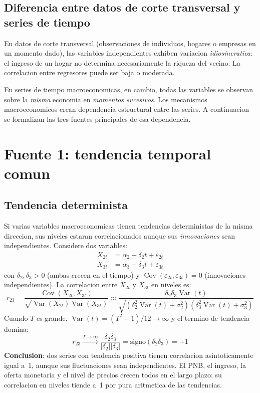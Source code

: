 \documentclass[12pt, letterpaper]{article}
\theoremstyle{remark}
\newcommand{\Var}{\operatorname{Var}}
\newcommand{\Cov}{\operatorname{Cov}}
\begin{document}
\subsection{Diferencia entre datos de corte transversal y series de tiempo}

En datos de corte transversal (observaciones de individuos, hogares o empresas
en un momento dado), las variables independientes exhiben variacion
\emph{idiosincratica}: el ingreso de un hogar no determina necesariamente la
riqueza del vecino. La correlacion entre regresores puede ser baja o moderada.

En series de tiempo macroeconomicas, en cambio, todas las variables se observan
sobre la \emph{misma} economia en \emph{momentos sucesivos}. Los mecanismos
macroeconomicos crean dependencia estructural entre las series. A continuacion
se formalizan las tres fuentes principales de esa dependencia.

\section{Fuente 1: tendencia temporal comun}

\subsection{Tendencia determinista}

Si varias variables macroeconomicas tienen tendencias deterministas de la misma
direccion, sus niveles estaran correlacionados aunque sus \emph{innovaciones}
sean independientes. Considere dos variables:
\begin{align}
  X_{2t} &= \alpha_2 + \delta_2 t + \varepsilon_{2t}
  \label{eq:trend2}\\
  X_{3t} &= \alpha_3 + \delta_3 t + \varepsilon_{3t}
  \label{eq:trend3}
\end{align}
con $\delta_2, \delta_3 > 0$ (ambas crecen en el tiempo) y
$\Cov(\varepsilon_{2t}, \varepsilon_{3t}) = 0$ (innovaciones independientes).
La correlacion entre $X_{2t}$ y $X_{3t}$ en niveles es:
\begin{equation}
  r_{23}
    = \frac{\Cov(X_{2t}, X_{3t})}{\sqrt{\Var(X_{2t})\Var(X_{3t})}}
    \approx \frac{\delta_2\delta_3 \Var(t)}
                 {\sqrt{(\delta_2^2\Var(t)+\sigma_2^2)(\delta_3^2\Var(t)+\sigma_3^2)}}
  \label{eq:corr_trend}
\end{equation}
Cuando $T$ es grande, $\Var(t) = (T^2-1)/12 \to \infty$ y el termino de
tendencia domina:
\begin{equation}
  r_{23} \xrightarrow{T\to\infty} \frac{\delta_2\delta_3}{|\delta_2||\delta_3|}
         = \text{signo}(\delta_2\delta_3) = +1
  \label{eq:corr_trend_lim}
\end{equation}
\textbf{Conclusion}: dos series con tendencia positiva tienen correlacion
asintoticamente igual a~1, aunque sus fluctuaciones sean independientes.
El PNB, el ingreso, la oferta monetaria y el nivel de precios crecen todos
en el largo plazo: su correlacion en niveles tiende a~1 por pura aritmetica
de las tendencias.
\end{document}
